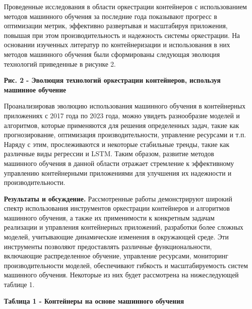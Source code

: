 Проведенные исследования в области оркестрации контейнеров с
использованием методов машинного обучения за последние года показывают
прогресс в оптимизации метрик, эффективно развертывая и масштабируя
приложения, повышая при этом производительность и надежность системы
оркестрации. На основании изученных литератур по контейнеризации и
использования в них методов машинного обучения были сформированы
следующая эволюция технологий приведенные в рисунке 2.

{\bfseries Рис. 2 - Эволюция технологий оркестрации контейнеров, используя
машинное обучение}

Проанализировав эволюцию использования машинного обучения в контейнерных
приложениях с 2017 года по 2023 года, можно увидеть разнообразие моделей
и алгоритмов, которые применяются для решения определенных задач, такие
как прогнозирование, оптимизация производительности, управление
ресурсами и т.п. Наряду с этим, прослеживаются и некоторые стабильные
тренды, такие как различные виды регрессии и LSTM. Таким образом,
развитие методов машинного обучения в данной области отражает стремление
к эффективному управлению контейнерными приложениями для улучшения их
надежности и производительности.

{\bfseries Результаты и обсуждение.} Рассмотренные работы демонстрируют
широкий спектр использования инструментов оркестрации контейнеров и
алгоритмов машинного обучения, а также их применимости к конкретным
задачам реализации и управления контейнерных приложений, разработки
более сложных моделей, учитывающие динамические изменения в окружающей
среде. Эти инструменты позволяют предоставлять различные
функциональности, включающие распределенное обучение, управление
ресурсами, мониторинг производительности моделей, обеспечивают гибкость
и масштабируемость систем машинного обучения. Некоторые из них будет
рассмотрена на нижеследующей таблице 1.

{\bfseries Таблица 1 - Контейнеры на основе машинного обучения}

